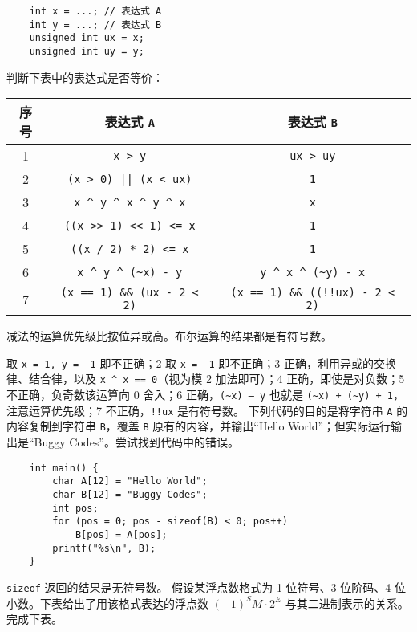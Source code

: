 \begin{problems}
\begin{verbatim}
    int x = ...; // 表达式 A
    int y = ...; // 表达式 B
    unsigned int ux = x;
    unsigned int uy = y;
		\end{verbatim}
		判断下表中的表达式是否等价：
		\begin{table}[H]
			\centering
			\begin{tabular}{|c|c|c|}
				\hline
				序号 & 表达式 \verb|A| & 表达式 \verb|B| \\ \hline
				1 & \verb|x > y| & \verb|ux > uy| \\ \hline
				2 & \verb+(x > 0) || (x < ux)+ & \verb|1| \\ \hline
				3 & \verb|x ^ y ^ x ^ y ^ x| & \verb|x| \\ \hline
				4 & \verb|((x >> 1) << 1) <= x| & \verb|1| \\ \hline
				5 & \verb|((x / 2) * 2) <= x| & \verb|1| \\ \hline
				6 & \verb|x ^ y ^ (~x) - y| & \verb|y ^ x ^ (~y) - x| \\ \hline
				7 & \verb|(x == 1) && (ux - 2 < 2)| & \verb|(x == 1) && ((!!ux) - 2 < 2)| \\ \hline
			\end{tabular}
		\end{table}
		\begin{hint}
			减法的运算优先级比按位异或高。布尔运算的结果都是有符号数。
		\end{hint}
		 取 \verb|x = 1, y = -1| 即不正确；2 取 \verb|x = -1| 即不正确；3 正确，利用异或的交换律、结合律，以及 \verb|x ^ x == 0|（视为模 2 加法即可）；4 正确，即使是对负数；5 不正确，负奇数该运算向 0 舍入；6 正确，\verb|(~x) – y| 也就是 \verb|(~x) + (~y) + 1|，注意运算优先级；7 不正确，\verb|!!ux| 是有符号数。
		\pro 下列代码的目的是将字符串 \texttt{A} 的内容复制到字符串 \texttt{B}，覆盖 \texttt{B} 原有的内容，并输出“Hello World”；但实际运行输出是“Buggy Codes”。尝试找到代码中的错误。
		\begin{verbatim}
    int main() {
        char A[12] = "Hello World";
        char B[12] = "Buggy Codes";
        int pos;
        for (pos = 0; pos - sizeof(B) < 0; pos++)
            B[pos] = A[pos];
        printf("%s\n", B);
    }
		\end{verbatim}
		\sol \verb|sizeof| 返回的结果是无符号数。
		\pro 假设某浮点数格式为 1 位符号、3 位阶码、4 位小数。下表给出了用该格式表达的浮点数 $(-1)^SM \cdot 2^E$ 与其二进制表示的关系。完成下表。
		\begin{table}[H]
			\centering
			\begin{tabular}{|c|c|c|c|c|}

\end{tabular}
\end{table}
\end{problems}

